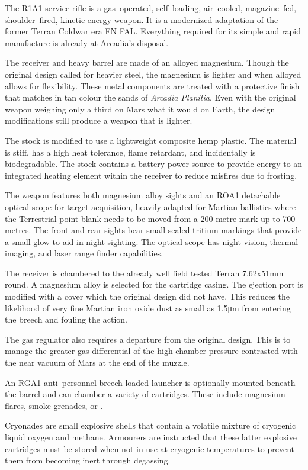 The R1A1 service rifle is a gas--operated, self--loading, air--cooled, magazine--fed, shoulder--fired, kinetic energy weapon. It is a modernized adaptation of the former Terran Coldwar era FN FAL. Everything required for its simple and rapid manufacture is already at Arcadia's disposal.

The receiver and heavy barrel are made of an alloyed magnesium. Though the original design called for heavier steel, the magnesium is lighter and when alloyed allows for flexibility. These metal components are treated with a protective finish that matches in tan colour the sands of {\it Arcadia Planitia}. Even with the original weapon weighing only a third on Mars what it would on Earth, the design modifications still produce a weapon that is lighter.

The stock is modified to use a lightweight composite hemp plastic. The material is stiff, has a high heat tolerance, flame retardant, and incidentally is biodegradable. The stock contains a battery power source to provide energy to an integrated heating element within the receiver to reduce misfires due to frosting.

The weapon features both magnesium alloy sights and an ROA1 detachable optical scope for target acquisition, heavily adapted for Martian ballistics where the Terrestrial point blank needs to be moved from a 200 metre mark up to 700 metres. The front and rear sights bear small sealed tritium markings that provide a small glow to aid in night sighting. The optical scope has night vision, thermal imaging, and laser range finder capabilities.

The receiver is chambered to the already well field tested Terran 7.62x51mm round. A magnesium alloy is selected for the cartridge casing. The ejection port is modified with a cover which the original design did not have. This reduces the likelihood of very fine Martian iron oxide dust as small as 1.5μm from entering the breech and fouling the action.

The gas regulator also requires a departure from the original design. This is to manage the greater gas differential of the high chamber pressure contrasted with the near vacuum of Mars at the end of the muzzle.

An RGA1 anti--personnel breech loaded launcher is optionally mounted beneath the barrel and can chamber a variety of cartridges. These include magnesium flares, smoke grenades, or . 

Cryonades are small explosive shells that contain a volatile mixture of cryogenic liquid oxygen and methane. Armourers are instructed that these latter explosive cartridges must be stored when not in use at cryogenic temperatures to prevent them from becoming inert through degassing.

